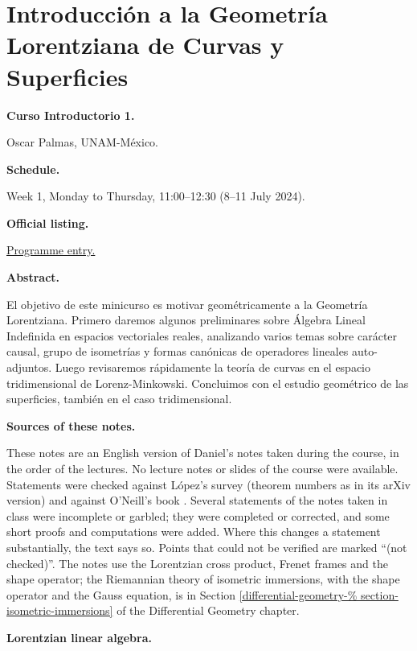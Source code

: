 \section{Introducción a la Geometría
Lorentziana de Curvas y Superficies}
\label{section-palmas-lorentzian-curves}

\medskip\noindent
{\bf Curso Introductorio 1.}

Oscar Palmas,
UNAM-México.

\medskip\noindent
{\bf Schedule.}

Week 1, Monday to Thursday, 11:00--12:30
(8--11 July 2024).

\medskip\noindent
{\bf Official listing.}

\href{%
https://naturales.ues.edu.sv/%
ecimpasv2024/introductory-curse-1/}{%
Programme entry.}

\medskip\noindent
{\bf Abstract.}

El objetivo de este minicurso es motivar
geométricamente a la Geometría Lorentziana.
Primero daremos algunos preliminares sobre
Álgebra Lineal Indefinida en espacios
vectoriales reales, analizando varios temas
sobre carácter causal, grupo de isometrías y
formas canónicas de operadores lineales
auto-adjuntos. Luego revisaremos rápidamente
la teoría de curvas en el espacio
tridimensional de Lorenz-Minkowski.
Concluimos con el estudio geométrico de las
superficies, también en el caso
tridimensional.

\medskip\noindent
{\bf Sources of these notes.}

These notes are an English version of
Daniel's notes taken during the course,
in the order of the lectures. No lecture
notes or slides of the course were
available. Statements were checked
against López's survey
\cite{lopez2014differential} (theorem
numbers as in its arXiv version) and
against O'Neill's book \cite{oneill}.
Several statements of the notes taken in
class were incomplete or garbled; they
were completed or corrected, and some
short proofs and computations were added.
Where this changes a statement
substantially, the text says so. Points
that could not be verified are marked
``(not checked)''. The notes use the
Lorentzian cross product, Frenet frames
and the shape operator; the Riemannian
theory of isometric immersions, with
the shape operator and the Gauss equation,
is in Section
\ref{differential-geometry-%
section-isometric-immersions}
of the Differential Geometry chapter.

\medskip\noindent
{\bf Lorentzian linear algebra.}

